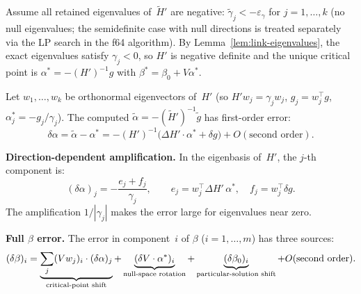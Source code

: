 \begin{remark}%
\label{lem:link-beta}
Assume all retained eigenvalues of~$\tilde H'$ are negative:
$\tilde\gamma_j < -\varepsilon_\gamma$ for $j = 1, \ldots, k$
(no null eigenvalues; the semidefinite case with null directions
is treated separately via the LP search in the f64 algorithm).
By Lemma~\ref{lem:link-eigenvalues}, the exact eigenvalues
satisfy $\gamma_j < 0$, so $H'$ is negative definite
and the unique critical point is
$\alpha^* = -(H')^{-1} g$ with $\beta^* = \beta_0 + V\alpha^*$.

Let $w_1, \ldots, w_k$ be orthonormal eigenvectors of~$H'$
(so $H' w_j = \gamma_j w_j$, $g_j = w_j^\top g$,
$\alpha^*_j = -g_j / \gamma_j$).
The computed $\tilde\alpha = -(\tilde H')^{-1} \tilde g$ has
first-order error:
\begin{equation}\label{eq:alpha-perturbation}
  \delta\alpha
  = \tilde\alpha - \alpha^*
  = -(H')^{-1}\bigl(\Delta H' \cdot \alpha^* + \delta g\bigr)
  + O(\text{second order}).
\end{equation}

\textbf{Direction-dependent amplification.}
In the eigenbasis of~$H'$, the $j$-th component is:
\begin{equation}\label{eq:alpha-component-error}
  (\delta\alpha)_j
  = -\frac{e_j + f_j}{\gamma_j},
  \qquad
  e_j = w_j^\top \Delta H'\, \alpha^*,
  \quad
  f_j = w_j^\top \delta g.
\end{equation}
The amplification $1/|\gamma_j|$ makes the error large for
eigenvalues near zero.

\textbf{Full $\beta$ error.}
The error in component~$i$ of $\beta$ ($i = 1, \ldots, m$) has three sources:
\begin{equation}\label{eq:beta-error-decomposition}
  (\delta\beta)_i
  = \underbrace{\sum_j (Vw_j)_i \cdot (\delta\alpha)_j}_{%
      \text{critical-point shift}}
  + \underbrace{(\delta V \cdot \alpha^*)_i}_{%
      \text{null-space rotation}}
  + \underbrace{(\delta\beta_0)_i}_{%
      \text{particular-solution shift}}
  + O(\text{second order}).
\end{equation}


\end{remark}
